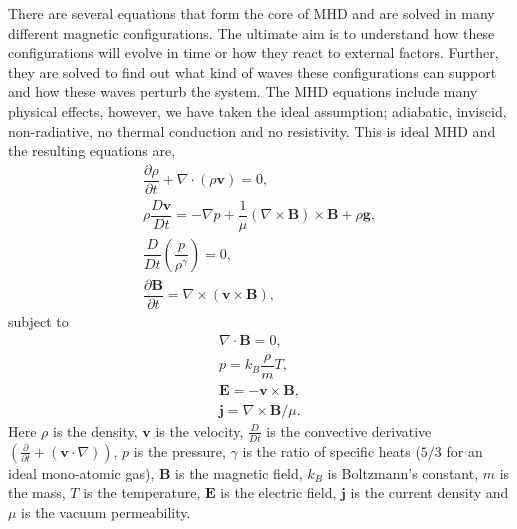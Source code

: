     There are several equations that form the core of MHD and are solved in many different magnetic configurations. 
    The ultimate aim is to understand how these configurations will evolve in time or how they react to external factors.
    Further, they are solved to find out what kind of waves these configurations can support and how these waves perturb the system. 
    The MHD equations include many physical effects, however, we have taken the ideal assumption; adiabatic, inviscid, non-radiative, no thermal conduction and no resistivity.
    This is ideal MHD and the resulting equations are,
    \begin{align}                                                         
        \dfrac{\partial \rho }{\partial t} + \nabla \cdot (\rho \boldsymbol{{v}}) =       
        0,\tag{Mass Conservation}\\                                  
        \rho \dfrac{{D}\boldsymbol{{v}}}{{D}t} =
        -\nabla p + \dfrac{1}{\mu}(\nabla \times \boldsymbol{{B}}) \times \boldsymbol{{B}} + \rho \boldsymbol{{g}},\tag{Equation of Motion}\\
        \dfrac{{D}}{{D}t} \left(\dfrac{p}{\rho^\gamma} \right)  = 0,\tag{Energy Equation}\\       
        \dfrac{\partial \boldsymbol{{B}}}{\partial t} = \nabla \times (\boldsymbol{{v}} \times \boldsymbol{{B}}),\tag{Induction Equation}               
    \end{align}
    subject to
    \begin{align}
        \nabla \cdot \boldsymbol{{B}} = 0,\tag{Solenoid Equation}\\
        p = {k_B} \dfrac{\rho}{{m}} {T},\tag{Ideal Gas Law}\\  
        \boldsymbol{{E}} = - \boldsymbol{{v}} \times \boldsymbol{{B}},\tag{Ohm's Law}\\
        \boldsymbol{{j}} = \nabla \times \boldsymbol{{B}}/ \mu.\tag{Electric Current}                          
    \end{align}
    Here $\rho$ is the density, $\boldsymbol{{v}}$ is the velocity, $\frac{{D}}{{D}t}$ is the convective derivative $\left(\frac{\partial}{\partial t} + (\boldsymbol{{v}}\cdot\nabla)\right)$, $p$ is the pressure, $\gamma$ is the ratio of specific heats ($5/3$ for an ideal mono-atomic gas), $\boldsymbol{{B}}$ is the magnetic field, ${k_B}$ is Boltzmann's constant, ${m}$ is the mass, ${T}$ is the temperature, $\boldsymbol{{E}}$ is the electric field, $\boldsymbol{{j}}$ is the current density and $\mu$ is the vacuum permeability. 

